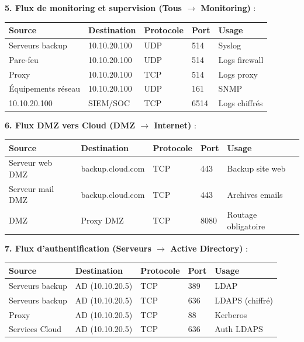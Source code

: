 \medskip

\noindent \textbf{5. Flux de monitoring et supervision (Tous $\rightarrow$ Monitoring)} :\\

\vspace{0.5cm}

\begin{tabular}{|l|l|l|l|l|}
\hline
\textbf{Source} & \textbf{Destination} & \textbf{Protocole} & \textbf{Port} & \textbf{Usage} \\ \hline
Serveurs backup & 10.10.20.100 & UDP & 514 & Syslog \\ \hline
Pare-feu & 10.10.20.100 & UDP & 514 & Logs firewall \\ \hline
Proxy & 10.10.20.100 & TCP & 514 & Logs proxy \\ \hline
Équipements réseau & 10.10.20.100 & UDP & 161 & SNMP \\ \hline
10.10.20.100 & SIEM/SOC & TCP & 6514 & Logs chiffrés \\ \hline
\end{tabular}

\newpage

\noindent \textbf{6. Flux DMZ vers Cloud (DMZ $\rightarrow$ Internet)} :\\
\vspace{0.5cm}

\begin{tabular}{|l|l|l|l|l|}
\hline
\textbf{Source} & \textbf{Destination} & \textbf{Protocole} & \textbf{Port} & \textbf{Usage} \\ \hline
Serveur web DMZ & backup.cloud.com & TCP & 443 & Backup site web \\ \hline
Serveur mail DMZ & backup.cloud.com & TCP & 443 & Archives emails \\ \hline
DMZ & Proxy DMZ & TCP & 8080 & Routage obligatoire \\ \hline
\end{tabular}

\medskip

\noindent \textbf{7. Flux d'authentification (Serveurs $\rightarrow$ Active Directory)} :\\

\vspace{0.5cm}

\begin{tabular}{|l|l|l|l|l|}
\hline
\textbf{Source} & \textbf{Destination} & \textbf{Protocole} & \textbf{Port} & \textbf{Usage} \\ \hline
Serveurs backup & AD (10.10.20.5) & TCP & 389 & LDAP \\ \hline
Serveurs backup & AD (10.10.20.5) & TCP & 636 & LDAPS (chiffré) \\ \hline
Proxy & AD (10.10.20.5) & TCP & 88 & Kerberos \\ \hline
Services Cloud & AD (10.10.20.5) & TCP & 636 & Auth LDAPS \\ \hline
\end{tabular}

